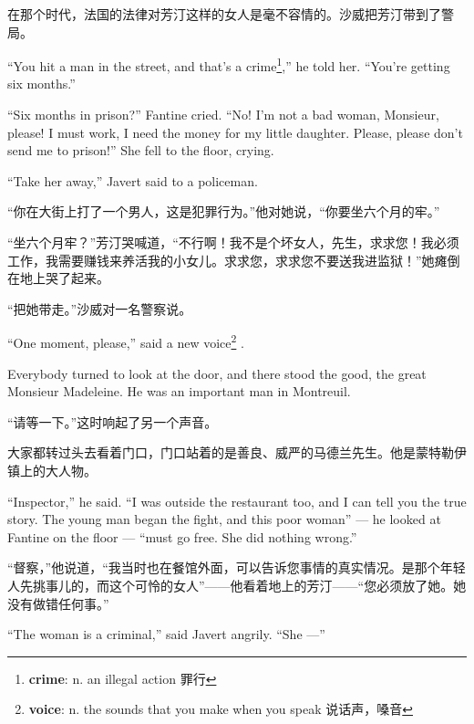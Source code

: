 \documentclass[fontset=ubuntu, zihao=5]{ctexart}
\begin{document}
\begin{paracol}{2}
  \switchcolumn

  在那个时代，法国的法律对芳汀这样的女人是毫不容情的。沙威把芳汀带到了警局。

  \switchcolumn*

  ``You hit a man in the street, and that's a crime\footnote{\textbf{crime}: n. an illegal action 罪行},'' he told her. ``You're getting six months.''


  ``Six months in prison?'' Fantine cried. ``No! I'm not a bad woman, Monsieur, please! I must work, I need the money for my little daughter. Please, please don't send me to prison!'' She fell to the floor, crying.

  ``Take her away,'' Javert said to a policeman.

  \switchcolumn

  “你在大街上打了一个男人，这是犯罪行为。”他对她说，“你要坐六个月的牢。”

  “坐六个月牢？”芳汀哭喊道，“不行啊！我不是个坏女人，先生，求求您！我必须工作，我需要赚钱来养活我的小女儿。求求您，求求您不要送我进监狱！”她瘫倒在地上哭了起来。


  “把她带走。”沙威对一名警察说。

  \switchcolumn*

  ``One moment, please,'' said a new voice\footnote{\textbf{voice}: n. the sounds that you make when you speak 说话声，嗓音}
  .

  Everybody turned to look at the door, and there stood the good, the great Monsieur Madeleine. He was an important man in Montreuil.

  \switchcolumn

  “请等一下。”这时响起了另一个声音。

  大家都转过头去看着门口，门口站着的是善良、威严的马德兰先生。他是蒙特勒伊镇上的大人物。

  \switchcolumn*

  ``Inspector,'' he said. ``I was outside the restaurant too, and I can tell you
  the true story. The young man began the fight, and this poor woman'' --- he
  looked at Fantine on the floor --- ``must go free. She did nothing wrong.''

  \switchcolumn

  “督察，”他说道，“我当时也在餐馆外面，可以告诉您事情的真实情况。是那个年轻人先挑事儿的，而这个可怜的女人”——他看着地上的芳汀——“您必须放了她。她没有做错任何事。”

  \switchcolumn*

  ``The woman is a criminal,'' said Javert angrily. ``She ---''



\end{paracol}
\end{document}
